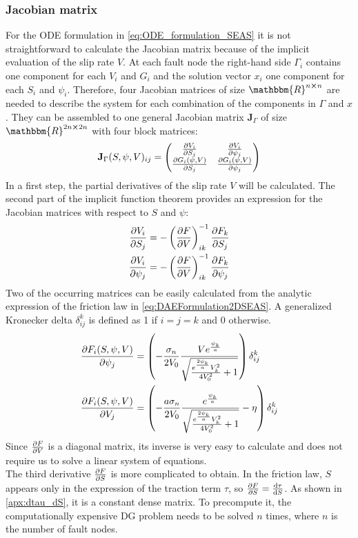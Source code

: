 \subsubsection{Jacobian matrix}
\label{sssec:Jacobian_ODE}
For the ODE formulation in \autoref{eq:ODE_formulation_SEAS} it is not straightforward to calculate the Jacobian matrix because of the implicit evaluation of the slip rate $V$. At each fault node the right-hand side $\Gamma_i$ contains one component for each $V_i$ and $G_i$ and the solution vector $x_i$ one component for each $S_i$ and $\psi_i$. Therefore, four Jacobian matrices of size $\mathbbm{R}^{n\cross n}$ are needed to describe the system for each combination of the components in $\Gamma$ and $x$. They can be assembled to one general Jacobian matrix $\mathbf{J}_\Gamma$ of size $\mathbbm{R}^{2n\cross 2n}$ with four block matrices:
\begin{equation}
\label{eq:Jacobian_ODE_formulation}
\mathbf{J}_\Gamma(S,\psi,V)_{ij} = \begin{pmatrix} 
\pdv{V_i}{S_j} &
\pdv{V_i}{\psi_j} \\ 
\pdv{G_i(\psi,V)}{S_j} &
\pdv{G_i(\psi,V)}{\psi_j}  \end{pmatrix}
\end{equation}
In a first step, the partial derivatives of the slip rate $V$ will be calculated. The second part of the implicit function theorem provides an expression for the Jacobian matrices with respect to $S$ and $\psi$:
\begin{align}
\label{eq:partial_V_S}
\pdv{V_i}{S_j} &= -\left(\pdv{F}{V}\right)_{ik}^{-1}\pdv{F_k}{S_j} \\ 
\label{eq:partial_V_psi}
\pdv{V_i}{\psi_j} &= -\left(\pdv{F}{V}\right)_{ik}^{-1}\pdv{F_k}{\psi_j}
\end{align}
Two of the occurring matrices can be easily calculated from the analytic expression of the friction law in \autoref{eq:DAEFormulation2DSEAS}. A generalized Kronecker delta $\delta_{ij}^k$ is defined as 1 if $i=j=k$ and 0 otherwise.
\begin{align}
\pdv{F_i(S,\psi,V)}{\psi_j} &= \left( -\frac{\sigma_n}{2V_0} \frac{Ve^{\frac{\psi_k}{a}}}{\sqrt{\frac{e^{\frac{2\psi_k}{a}}V_k^2}{4V_0^2}+1}}\right)\delta_{ij}^k 
\label{eq:partial_df_dpsi} \\
\pdv{F_i(S,\psi,V)}{V_j} &= \left( -\frac{a\sigma_n}{2V_0} \frac{e^{\frac{\psi_k}{a}}}{\sqrt{\frac{e^{\frac{2\psi_k}{a}}V_k^2}{4V_0^2}+1}}-\eta\right)\delta_{ij}^k 
\label{eq:partial_df_dV}
\end{align}
Since $\pdv{F}{V}$ is a diagonal matrix, its inverse is very easy to calculate and does not require us to solve a linear system of equations. \\
The third derivative $\pdv{F}{S}$ is more complicated to obtain. In the friction law, $S$ appears only in the expression of the traction term $\tau$, so $\pdv{F}{S}=\dv{\tau}{S}$. As shown in \autoref{apx:dtau_dS}, it is a constant dense matrix. To precompute it, the computationally expensive DG problem needs to be solved $n$ times, where $n$ is the number of fault nodes. \\


